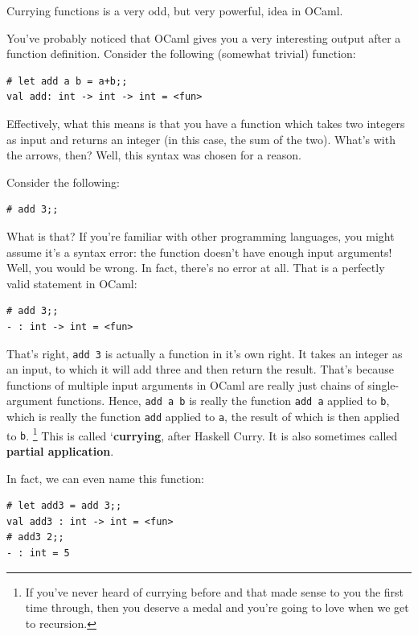 \documentclass[10pt]{book}
\begin{document}
Currying functions is a very odd, but very powerful, idea in OCaml.

You've probably noticed that OCaml gives you a very interesting output
after a function definition. Consider the following (somewhat trivial) function:

\beforeverb
\begin{verbatim}
# let add a b = a+b;;
val add: int -> int -> int = <fun>
\end{verbatim}
\afterverb

Effectively, what this means is that you have a function which takes two 
integers as input and returns an integer (in this case, the sum of the two). 
What's with the arrows, then? Well, this syntax was chosen for a reason.

Consider the following:

\beforeverb
\begin{verbatim}
# add 3;;
\end{verbatim}
\afterverb

What is that? If you're familiar with other programming languages, you might 
assume it's a syntax error: the function doesn't have enough input arguments!
Well, you would be wrong. In fact, there's no error at all. That is a perfectly
valid statement in OCaml:

\beforeverb
\begin{verbatim}
# add 3;;
- : int -> int = <fun>
\end{verbatim}
\afterverb

That's right, {\tt add 3} is actually a function in it's own right. It takes an integer
as an input, to which it will add three and then return the result. That's because functions
of multiple input arguments in OCaml are really just chains of single-argument functions. 
Hence, {\tt add a b} is really the function {\tt add a} applied to {\tt b}, which is really 
the function {\tt add} applied to {\tt a}, the result of which is then applied to {\tt b}. 
\footnote{If you've never heard of currying before and that made sense to you the first 
time through, then you deserve a medal and you're going to love when we get to recursion.} 
This is called `{\bf currying}, after Haskell Curry. It is also sometimes called 
{\bf partial application}.


In fact, we can even name this function:

\beforeverb
\begin{verbatim}
# let add3 = add 3;;
val add3 : int -> int = <fun>
# add3 2;;
- : int = 5
\end{verbatim}
\afterverb
\end{document}
